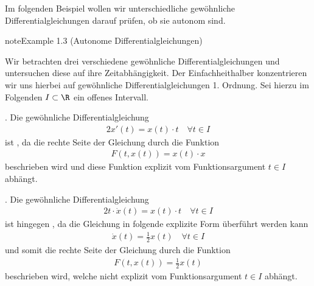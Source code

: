 \documentclass[letterpaper,10pt,german]{jupyterBook}
\begin{document}
\sphinxAtStartPar
Im folgenden Beispiel wollen wir unterschiedliche gewöhnliche Differentialgleichungen darauf prüfen, ob sie autonom sind.
\label{ode/repetition:example-4}
\begin{sphinxadmonition}{note}{Example 1.3 (Autonome Differentialgleichungen)}



\sphinxAtStartPar
Wir betrachten drei verschiedene gewöhnliche Differentialgleichungen und untersuchen diese auf ihre Zeitabhängigkeit.
Der Einfachheit\sphinxhyphen{}halber konzentrieren wir uns hierbei auf gewöhnliche Differentialgleichungen 1. Ordnung.
Sei hierzu  im Folgenden \(I \subset \R\) ein offenes Intervall.

. Die gewöhnliche Differentialgleichung
\begin{equation*}
\begin{split}2x'(t) = x(t)\cdot t \quad \forall t \in I\end{split}
\end{equation*}
\sphinxAtStartPar
ist , da die rechte Seite der Gleichung durch die Funktion
\begin{equation*}
\begin{split}F(t,x(t)) = x(t) \cdot x\end{split}
\end{equation*}
\sphinxAtStartPar
beschrieben wird und diese Funktion explizit vom Funktionsargument \(t \in I\) abhängt.



. Die gewöhnliche Differentialgleichung
\begin{equation*}
\begin{split}2t\cdot \dot{x}(t) = x(t)\cdot t \quad \forall t \in I\end{split}
\end{equation*}
\sphinxAtStartPar
ist hingegen , da die Gleichung in folgende explizite Form überführt werden kann
\begin{equation*}
\begin{split}\dot{x}(t) = \frac{1}{2} x(t) \quad \forall t \in I\end{split}
\end{equation*}
\sphinxAtStartPar
und somit die rechte Seite der Gleichung durch die Funktion
\begin{equation*}
\begin{split}F(t,x(t)) = \frac{1}{2}x(t)\end{split}
\end{equation*}
\sphinxAtStartPar
beschrieben wird, welche nicht explizit vom Funktionsargument \(t \in I\) abhängt.




\end{sphinxadmonition}
\end{document}
